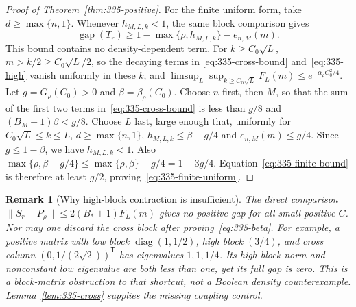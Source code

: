 \documentclass[11pt]{article}
\newtheorem{remark}[theorem]{Remark}
\newcommand{\diag}{\operatorname{diag}}
\newcommand{\gap}{\operatorname{gap}}
\begin{document}
\begin{proof}[Proof of Theorem~\ref{thm:335-positive}]
For the finite uniform form, take $d\ge\max\{n,1\}$. Whenever
$h_{M,L,k}<1$, the same block comparison gives
\begin{equation}\label{eq:335-finite-bound}
 \gap(T_r)\ge1-\max\{\rho,h_{M,L,k}\}-e_{n,M}(m).
\end{equation}
This bound contains no density-dependent term. For $k\ge C_0\sqrt L$,
$m>k/2\ge C_0\sqrt L/2$, so the decaying terms in
\eqref{eq:335-cross-bound} and~\eqref{eq:335-high} vanish uniformly
in these $k$, and
$\limsup_L\sup_{k\ge C_0\sqrt L}F_L(m)\le e^{-\alpha_\rho C_0^2/4}$.
Let $g=G_\rho(C_0)>0$ and $\beta=\beta_\rho(C_0)$.
Choose $n$ first, then $M$, so that the sum of the first two terms
in~\eqref{eq:335-cross-bound} is less than $g/8$ and
$(B_M-1)\beta<g/8$. Choose $L$ last, large enough that, uniformly
for $C_0\sqrt L\le k\le L$, $d\ge\max\{n,1\}$,
$h_{M,L,k}\le\beta+g/4$ and $e_{n,M}(m)\le g/4$.
Since $g\le1-\beta$, we have $h_{M,L,k}<1$. Also
$\max\{\rho,\beta+g/4\}\le\max\{\rho,\beta\}+g/4=1-3g/4$.
Equation~\eqref{eq:335-finite-bound} is therefore at least $g/2$,
proving~\eqref{eq:335-finite-uniform}.
\end{proof}

\begin{remark}[Why high-block contraction is insufficient]
The direct comparison $\|S_r-P_\rho\|\le2(B_*+1)F_L(m)$ gives no
positive gap for all small positive $C$. Nor may one discard the cross
block after proving~\eqref{eq:335-beta}. For example, a positive matrix
with low block $\diag(1,1/2)$, high block $(3/4)$, and cross column
$(0,1/(2\sqrt2))^{\mathsf T}$ has eigenvalues $1,1,1/4$.
Its high-block norm and nonconstant low eigenvalue are both less than
one, yet its full gap is zero. This is a block-matrix obstruction to
that shortcut, not a Boolean density counterexample.
Lemma~\ref{lem:335-cross} supplies the missing coupling control.
\end{remark}
\end{document}
